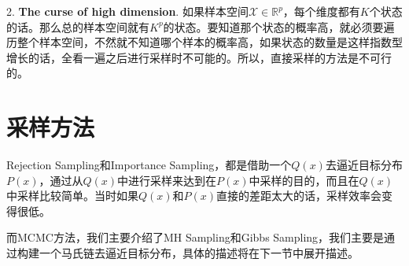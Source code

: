 \documentclass[a4paper]{article}
\begin{document}
2. \textbf{The curse of high dimension}. 如果样本空间$\mathcal{X} \in \mathbb{R}^p$，每个维度都有$K$个状态的话。那么总的样本空间就有$K^p$的状态。要知道那个状态的概率高，就必须要遍历整个样本空间，不然就不知道哪个样本的概率高，如果状态的数量是这样指数型增长的话，全看一遍之后进行采样时不可能的。所以，直接采样的方法是不可行的。

\section{采样方法}
Rejection Sampling和Importance Sampling，都是借助一个$Q(x)$去逼近目标分布$P(x)$，通过从$Q(x)$中进行采样来达到在$P(x)$中采样的目的，而且在$Q(x)$中采样比较简单。当时如果$Q(x)$和$P(x)$直接的差距太大的话，采样效率会变得很低。

而MCMC方法，我们主要介绍了MH Sampling和Gibbs Sampling，我们主要是通过构建一个马氏链去逼近目标分布，具体的描述将在下一节中展开描述。
\end{document}
